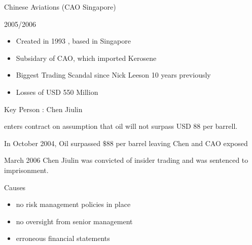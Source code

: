 Chinese Aviations (CAO Singapore)

2005/2006
\begin{itemize}
\item Created in 1993 , based in Singapore
\item Subsidary of CAO, which imported Kerosene
\item Biggest Trading Scandal since Nick Leeson 10 years previously
\item Losses of USD 550 Million
\end{itemize}

Key Person : Chen Jiulin

enters contract on assumption that oil will  not surpass USD 88 per barrell.

In October 2004, Oil surpassed $\$88$ per barrel leaving Chen and CAO exposed

March 2006
Chen Jiulin was convicted of insider trading and was sentenced to imprisonment.

Causes 
\begin{itemize}
\item no risk management policies in place
\item no oversight from senior management
\item erroneous financial statements
\end{itemize}

